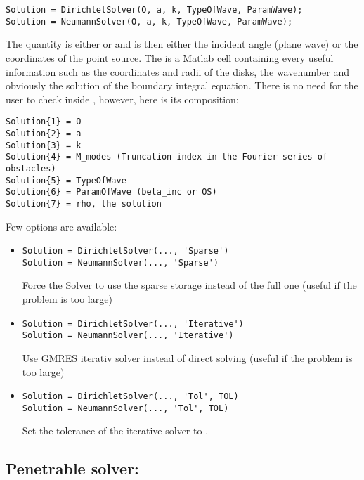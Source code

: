 \begin{lstlisting}
Solution = DirichletSolver(O, a, k, TypeOfWave, ParamWave);
Solution = NeumannSolver(O, a, k, TypeOfWave, ParamWave);
\end{lstlisting}
The quantity  is either  or  and  is then either the incident angle (plane wave) or the coordinates of the point source. The  is a Matlab cell containing every useful information such as the coordinates and radii of the disks, the wavenumber and obviously the solution of the boundary integral equation. There is no need for the user to check inside , however, here is its composition:
\begin{lstlisting}
Solution{1} = O
Solution{2} = a
Solution{3} = k
Solution{4} = M_modes (Truncation index in the Fourier series of obstacles)
Solution{5} = TypeOfWave
Solution{6} = ParamOfWave (beta_inc or OS)
Solution{7} = rho, the solution
\end{lstlisting}
Few options are available:
\begin{itemize}
\item
\begin{lstlisting}
Solution = DirichletSolver(..., 'Sparse')
Solution = NeumannSolver(..., 'Sparse')
\end{lstlisting}
Force the Solver to use the sparse storage instead of the full one (useful if the problem is too large)
\item
\begin{lstlisting}
Solution = DirichletSolver(..., 'Iterative')
Solution = NeumannSolver(..., 'Iterative')
\end{lstlisting}
Use GMRES iterativ solver instead of direct solving (useful if the problem is too large)
\item \begin{lstlisting}
Solution = DirichletSolver(..., 'Tol', TOL)
Solution = NeumannSolver(..., 'Tol', TOL)
\end{lstlisting}
Set the tolerance of the iterative solver to .
\end{itemize}

\subsection{Penetrable solver: \PenetrableSolver}
\label{secFun:PenetrableSolver}

